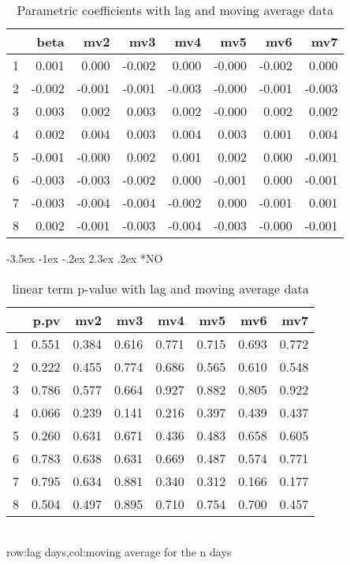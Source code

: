\documentclass[a4paper, 12pt]{article}
\makeatletter
\def\large{\fontsize{14}{20}\selectfont}
\renewcommand\subsection{\@startsection {subsection}{1}{\z@}%
                                   {-3.5ex \@plus -1ex \@minus -.2ex}%
                                   {2.3ex \@plus.2ex}%
                                   {\centering\normalfont\large\bfseries}}
\makeatother
\begin{document}
\begin{table}[h]
\centering
\caption{Parametric coefficients with lag and moving average data}
\begin{tabular}{rrrrrrrr}
  \hline
 & beta & mv2 & mv3 & mv4 & mv5 & mv6 & mv7 \\
  \hline
1 & 0.001 & 0.000 & -0.002 & 0.000 & -0.000 & -0.002 & 0.000 \\
  2 & -0.002 & -0.001 & -0.001 & -0.003 & -0.000 & -0.001 & -0.003 \\
  3 & 0.003 & 0.002 & 0.003 & 0.002 & -0.000 & 0.002 & 0.002 \\
  4 & 0.002 & 0.004 & 0.003 & 0.004 & 0.003 & 0.001 & 0.004 \\
  5 & -0.001 & -0.000 & 0.002 & 0.001 & 0.002 & 0.000 & -0.001 \\
  6 & -0.003 & -0.003 & -0.002 & 0.000 & -0.001 & 0.000 & -0.001 \\
  7 & -0.003 & -0.004 & -0.004 & -0.002 & 0.000 & -0.001 & 0.001 \\
  8 & 0.002 & -0.001 & -0.003 & -0.004 & -0.003 & -0.000 & -0.001 \\
   \hline
\end{tabular}
\end{table}
\clearpage
\subsection*{NO}
\begin{table}[h]
\centering
\caption{linear term p-value with lag and moving average data}
\begin{tabular}{rrrrrrrr}
  \hline
 & p.pv & mv2 & mv3 & mv4 & mv5 & mv6 & mv7 \\
  \hline
1 & 0.551 & 0.384 & 0.616 & 0.771 & 0.715 & 0.693 & 0.772 \\
  2 & 0.222 & 0.455 & 0.774 & 0.686 & 0.565 & 0.610 & 0.548 \\
  3 & 0.786 & 0.577 & 0.664 & 0.927 & 0.882 & 0.805 & 0.922 \\
  4 & 0.066 & 0.239 & 0.141 & 0.216 & 0.397 & 0.439 & 0.437 \\
  5 & 0.260 & 0.631 & 0.671 & 0.436 & 0.483 & 0.658 & 0.605 \\
  6 & 0.783 & 0.638 & 0.631 & 0.669 & 0.487 & 0.574 & 0.771 \\
  7 & 0.795 & 0.634 & 0.881 & 0.340 & 0.312 & 0.166 & 0.177 \\
  8 & 0.504 & 0.497 & 0.895 & 0.710 & 0.754 & 0.700 & 0.457 \\
   \hline
\end{tabular}
\\row:lag days,col:moving average for the n days
\end{table}
\end{document}
